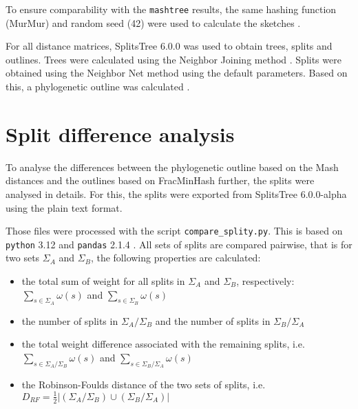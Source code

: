 To ensure comparability with the \texttt{mashtree} results, the same hashing
function (MurMur) and random seed (42) were used to calculate the sketches
\cite{katzMashtreeRapidComparison2019,ondovMashFastGenome2016}.

For all distance matrices, SplitsTree 6.0.0
\cite{husonApplicationPhylogeneticNetworks2006} was used to obtain trees, splits
and outlines. Trees were calculated using the Neighbor Joining method
\cite{saitouNeighborjoiningMethodNew1987}. Splits were obtained using the
Neighbor Net method
\cite{bryantNeighborNetAgglomerativeMethod2004,bryantNeighborNetImprovedAlgorithms2023}
using the default parameters. Based on this, a phylogenetic outline was
calculated \cite{bagciMicrobialPhylogeneticContext2021}.



\section{Split difference analysis}
\label{sec:splitanalysis}
To analyse the differences between the phylogenetic outline based on the Mash
distances and the outlines based on FracMinHash further, the splits were
analysed in details. For this, the splits were exported from SplitsTree
6.0.0-alpha \cite{husonApplicationPhylogeneticNetworks2006} using the plain text
format.

Those files were processed with the script \texttt{compare\_splity.py}. This is
based on \texttt{python} 3.12  and \texttt{pandas} 2.1.4
\cite{PandasdevPandasPandas2024,mckinneyDataStructuresStatistical2010}. All sets
of splits are compared pairwise, that is for two sets $\Sigma_A$ and $\Sigma_B$,
the following properties are calculated:

\begin{itemize}
  \item the total sum of weight for all splits in $\Sigma_A$ and $\Sigma_B$,
  respectively: $\sum_{s \in \Sigma_A}{\omega(s)}$ and $\sum_{s \in
  \Sigma_B}{\omega(s)}$ 
  \item the number of splits in $\Sigma_A / \Sigma_B$ and the number of splits
  in $\Sigma_B / \Sigma_A$
  \item the total weight difference associated with the remaining splits, i.e.
  $\sum_{s \in \Sigma_A / \Sigma_B}{\omega(s)}$ and $\sum_{s \in \Sigma_B /
  \Sigma_A}{\omega(s)}$
  \item the Robinson-Foulds distance
  \cite{robinsonComparisonPhylogeneticTrees1981} of the two sets of splits, i.e.
  $D_{RF} = \frac{1}{2}|(\Sigma_A / \Sigma_B) \cup (\Sigma_B / \Sigma_A)|$
\end{itemize}

